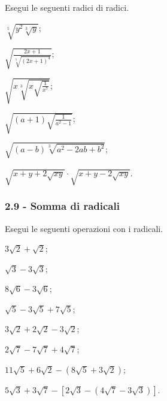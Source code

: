 \begin{esercizio}[\Ast]
 \label{ese:2.63}
Esegui le seguenti radici di radici.
\begin{multicols}{2}
 \begin{enumeratea}
 \item $\sqrt[5]{y^{2}\sqrt[3]{y}}$;
 \item $\sqrt{\frac{2x+1}{\sqrt[5]{(2x+1)^{4}}}}$;
 \item $\sqrt{x\sqrt[3]{x\sqrt{\frac{1}{x^{7}}}}}$;
 \item $\sqrt{(a+1)\sqrt{\frac{1}{a^{2}-1}}}$;
 \item $\sqrt{(a-b)\sqrt[3]{a^{2}-2ab+b^{2}}}$;
 \item $\sqrt{x+y+2\sqrt{xy}}\cdot\sqrt{x+y-2\sqrt{xy}}$.
 \end{enumeratea}
 \end{multicols}
\end{esercizio}

\subsubsection*{2.9 - Somma di radicali}

\begin{esercizio}[\Ast]
 \label{ese:2.64}
Esegui le seguenti operazioni con i radicali.
 \begin{multicols}{2}
 \begin{enumeratea}
 \item $3\sqrt 2+\sqrt 2$;
 \item $\sqrt 3-3\sqrt 3$;
 \item $8\sqrt 6-3\sqrt 6$;
 \item $\sqrt 5-3\sqrt 5+7\sqrt 5$;
 \item $3\sqrt 2+2\sqrt 2-3\sqrt 2$;
 \item $2\sqrt 7-7\sqrt 7+4\sqrt 7$;
 \item $11\sqrt 5+6\sqrt 2-(8\sqrt 5+3\sqrt 2)$;
 \item $5\sqrt 3+3\sqrt 7-[2\sqrt 3-(4\sqrt 7-3\sqrt 3)]$.
 \end{enumeratea}
 \end{multicols}
\end{esercizio}

